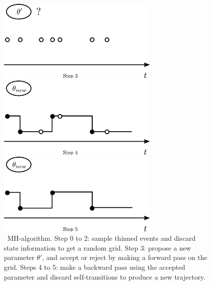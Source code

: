 \begin{figure}[H]
\begin{minipage}[!hp]{0.45\linewidth}
  \centering
    \includegraphics [width=0.70\textwidth, angle=0]{figs/plotn3.pdf}
    \vspace{-0 in}
  \end{minipage}
  \begin{minipage}[!hp]{0.45\linewidth}
  \centering
    \includegraphics [width=0.70\textwidth, angle=0]{figs/plotn4.pdf}
    \vspace{-0 in}
  \end{minipage}
  \begin{minipage}[!hp]{0.45\linewidth}
  \centering
    \includegraphics [width=0.70\textwidth, angle=0]{figs/plotn5.pdf}
    \vspace{-0 in}
  \end{minipage}
  \caption{\Naive\ MH-algorithm. Step 0 to 2: sample thinned events
  and discard state information to get a random grid. Step 3: 
propose a new parameter $\theta'$, and accept or reject by making
a forward pass on the grid. Steps 4 to 5: make a backward pass using
the accepted parameter and discard self-transitions to produce a new
trajectory.}
   \label{fig:naive_mh}

  \end{figure}

